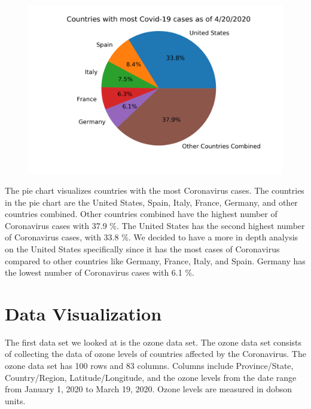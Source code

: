 \documentclass[10pt,journal,compsoc]{IEEEtran}
\begin{document}
{{\begin{figure}[!htbp] %
	\includegraphics[scale=0.4]{covid-us.png}\\ 
	\centering
	\label{LP-COVID-World}
\end{figure}

	The pie chart visualizes countries with the most Coronavirus cases. The countries in the pie chart are the United States, Spain, Italy, France, Germany, and other countries combined. Other countries combined have the highest number of Coronavirus cases with 37.9 \%. The United States has the second highest number of Coronavirus cases, with 33.8 \%. We decided to have a more in depth analysis on the United States specifically since it has the most cases of Coronavirus compared to other countries like Germany, France, Italy, and Spain. Germany has the lowest number of Coronavirus cases with 6.1 \%.


\section{Data Visualization}\label{sec:data visualization}

	The first data set we looked at is the ozone data set. \cite{eeemonts-2020} The ozone data set consists of collecting the data of ozone levels of countries affected by the Coronavirus. The ozone data set has 100 rows and 83 columns. Columns include Province/State, Country/Region, Latitude/Longitude, and the ozone levels from the date range from January 1, 2020 to March 19, 2020. Ozone levels are measured in dobson units.

}}
\end{document}
